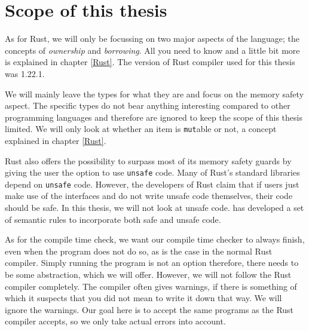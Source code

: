 



\section{Scope of this thesis}
As for Rust, we will only be focussing on two major aspects of the language; the concepts of \emph{ownership} and \emph{borrowing}. All you need to know and a little bit more is explained in chapter \ref{Rust}. The version of Rust compiler used for this thesis was 1.22.1. 

We will mainly leave the types for what they are and focus on the memory safety aspect. The specific types do not bear anything interesting compared to other programming languages and therefore are ignored to keep the scope of this thesis limited. We will only look at whether an item is \texttt{mut}able or not, a concept explained in chapter \ref{Rust}. 

Rust also offers the possibility to surpass most of its memory safety guards by giving the user the option to use \texttt{unsafe} code. Many of Rust's standard libraries depend on \texttt{unsafe} code. However, the developers of Rust claim that if users just make use of the interfaces and do not write unsafe code themselves, their code should be safe. In this thesis, we will not look at unsafe code. \cite{jung2017rustbelt} has developed a set of semantic rules to incorporate both safe and unsafe code. 

As for the compile time check, we want our compile time checker to always finish, even when the program does not do so, as is the case in the normal Rust compiler. Simply running the program is not an option therefore, there needs to be some abstraction, which we will offer. However, we will not follow the Rust compiler completely. The compiler often gives warnings, if there is something of which it suspects that you did not mean to write it down that way. We will ignore the warnings. Our goal here is to accept the same programs as the Rust compiler accepts, so we only take actual errors into account. 

